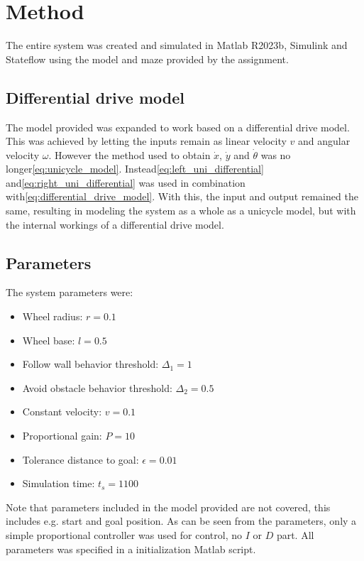 \section{Method}

The entire system was created and simulated in Matlab R2023b, Simulink and Stateflow using the model and maze provided by the assignment.


\subsection{Differential drive model}

The model provided was expanded to work based on a differential drive model. This was achieved by letting the inputs remain as linear velocity $v$ and angular velocity $\omega$. However the method used to obtain $\dot{x}$, $\dot{y}$ and $\dot{\theta}$ was no longer\:\eqref{eq:unicycle_model}. Instead\:\eqref{eq:left_uni_differential} and\:\eqref{eq:right_uni_differential} was used in combination with\:\eqref{eq:differential_drive_model}. With this, the input and output remained the same, resulting in modeling the system as a whole as a unicycle model, but with the internal workings of a differential drive model.


\subsection{Parameters}

The system parameters were:
\begin{itemize}
    \item Wheel radius: $r = 0.1$
    \item Wheel base: $l = 0.5$
    \item Follow wall behavior threshold: $\Delta_1 = 1$
    \item Avoid obstacle behavior threshold: $\Delta_2 = 0.5$
    \item Constant velocity: $v = 0.1$
    \item Proportional gain: $P = 10$
    \item Tolerance distance to goal: $\epsilon = 0.01$
    \item Simulation time: $t_s = 1100$
\end{itemize}
Note that parameters included in the model provided are not covered, this includes e.g. start and goal position.
As can be seen from the parameters, only a simple proportional controller was used for control, no $I$ or $D$ part.
All parameters was specified in a initialization Matlab script.

